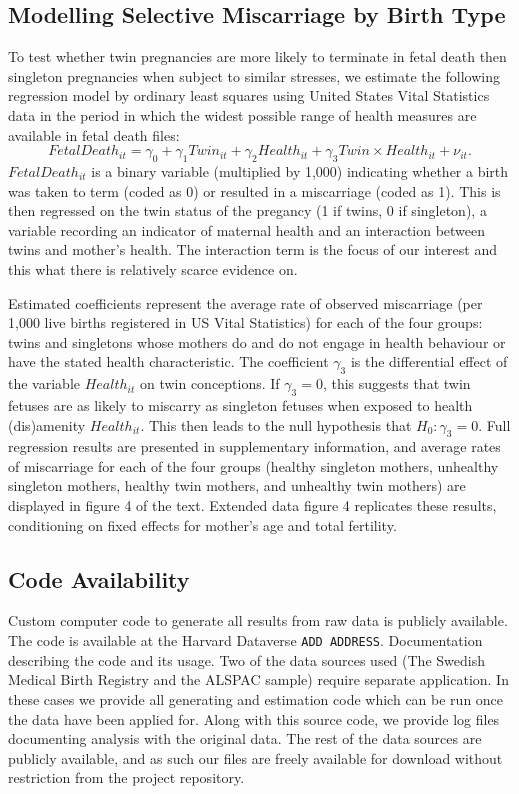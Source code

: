 \documentclass{nature}
\begin{document}
\begin{linenumbers}
\subsection{Modelling Selective Miscarriage by Birth Type}
To test whether twin  pregnancies are more likely to terminate in fetal death then singleton pregnancies when subject to similar stresses, we estimate the following regression model by ordinary least squares using United States Vital Statistics data in the period in which the widest possible range of health measures are available in fetal death files:
\begin{equation}
FetalDeath_{it} = \gamma_0 + \gamma_1 Twin_{it} + \gamma_2 Health_{it} + \gamma_3 Twin\times Health_{it} + \nu_{it}.
\end{equation}
$FetalDeath_{it}$ is a binary variable (multiplied by 1,000) indicating whether a birth was taken to term (coded as 0) or resulted in a miscarriage (coded as 1).  This is then regressed on the twin status of the pregancy (1 if twins, 0 if singleton), a variable recording an indicator of maternal health and an interaction between twins and mother's health. The interaction term is the focus of our interest and this what there is relatively scarce evidence on. 

Estimated coefficients represent the average rate of observed miscarriage (per 1,000 live births registered in US Vital Statistics) for each of the four groups: twins and singletons whose mothers do and do not engage in health behaviour or have the stated health characteristic. The coefficient $\gamma_3$ is the differential effect of the variable $Health_{it}$ on twin conceptions. If $\gamma_3=0$, this suggests that twin fetuses are as likely to miscarry as singleton fetuses when exposed to health (dis)amenity $Health_{it}$.  This then leads to the null hypothesis that $H_0: \gamma_3=0$. Full regression results are presented in supplementary information, and average rates of miscarriage for each of the four groups (healthy singleton mothers, unhealthy singleton mothers, healthy twin mothers, and unhealthy twin mothers) are displayed in figure 4 of the text.  Extended data figure 4 replicates these results, conditioning on fixed effects for mother's age and total fertility.

\subsection{Code Availability}
Custom computer code to generate all results from raw data is publicly available. The code is available at the Harvard Dataverse \texttt{ADD ADDRESS}.  Documentation describing the code and its usage.  Two of the data sources used (The Swedish Medical Birth Registry and the ALSPAC sample) require separate application.  In these cases we provide all generating and estimation code which can be run once the data have been applied for.  Along with this source code, we provide log files documenting analysis with the original data.  The rest of the data sources are publicly available, and as such our files are freely available for download without restriction from the project repository.


\end{linenumbers}
\end{document}
